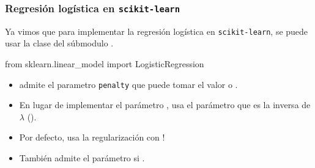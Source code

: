 \documentclass{beamer}
\begin{document}
\begin{frame}[fragile]
   \frametitle{Regresión logística en {\tt scikit-learn}}
   \begin{overlayarea}{\textwidth}{\textheight} 
   Ya vimos que para implementar la regresión logística en {\tt scikit-learn}, se puede
   usar la clase  del súbmodulo .
   \begin{pyverbatim}
from sklearn.linear_model import LogisticRegression
\end{pyverbatim}
\medskip


\begin{itemize}
\item<2->  admite el parametro {\tt penalty} que puede
tomar el valor  o .
\item<3-> En lugar de implementar el parámetro , usa el parámetro
   que es la inversa de $\lambda$ (). 
\item<4-> Por defecto,  usa la regularización
   con !
\item<5-> También admite el parámetro  si .
\end{itemize}
\end{overlayarea}   
\end{frame}
\end{document}
